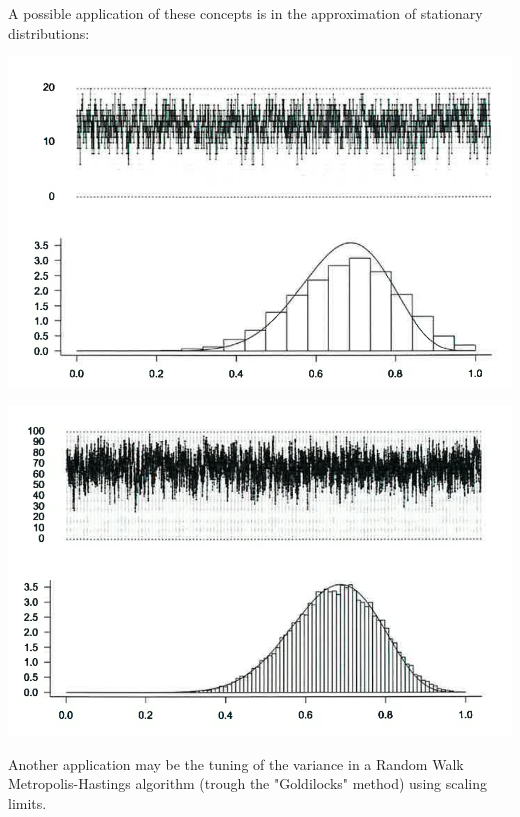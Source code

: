 \documentclass{article}
\begin{document}
	
	A possible application of these concepts is in the approximation of stationary distributions:\par
	\begin{minipage}{0.5\textwidth}
		\includegraphics[width=1\linewidth]{drawings/approxstation.png}
	\end{minipage}\hfill
	\begin{minipage}{0.5\textwidth}
		\includegraphics[width=1\linewidth]{drawings/approx2.png}
	\end{minipage}
	Another application may be the tuning of the variance in a Random Walk Metropolis-Hastings algorithm (trough the "Goldilocks" method) using scaling limits.
\end{document}
